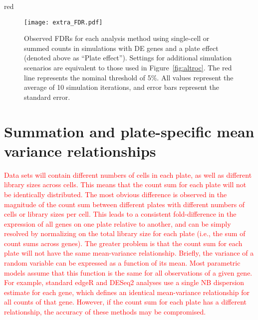 \documentclass{article}
\newcommand\revised[1]{\textcolor{red}{#1}}
\begin{document}
\begin{color}{red}
\begin{figure}[p]
    \begin{center}
        \texttt{[image: extra\_FDR.pdf]}
    \end{center}
    \caption{
        Observed FDRs for each analysis method using single-cell or summed counts in simulations with DE genes and a plate effect (denoted above as ``Plate effect'').
        Settings for additional simulation scenarios are equivalent to those used in Figure~\ref{fig:altroc}.
        The red line represents the nominal threshold of 5\%.
        All values represent the average of 10 simulation iterations, and error bars represent the standard error.
    }
\end{figure}
\end{color}

\section{Summation and plate-specific mean variance relationships}
\revised{Data sets will contain different numbers of cells in each plate, as well as different library sizes across cells.
This means that the count sum for each plate will not be identically distributed.
The most obvious difference is observed in the magnitude of the count sum between different plates with different numbers of cells or library sizes per cell.
This leads to a consistent fold-difference in the expression of all genes on one plate relative to another, and can be simply resolved by normalizing on the total library size for each plate (i.e., the sum of count sums across genes).
The greater problem is that the count sum for each plate will not have the same mean-variance relationship.
Briefly, the variance of a random variable can be expressed as a function of its mean.
Most parametric models assume that this function is the same for all observations of a given gene.
For example, standard edgeR and DESeq2 analyses use a single NB dispersion estimate for each gene, which defines an identical mean-variance relationship for all counts of that gene.
However, if the count sum for each plate has a different relationship, the accuracy of these methods may be compromised.}
\end{document}
